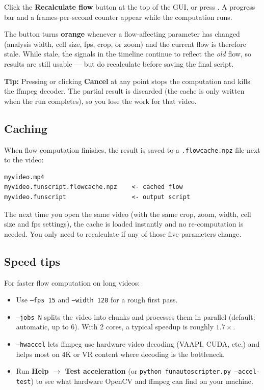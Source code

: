\documentclass[11pt,a4paper]{article}
\newcommand{\code}[1]{\texttt{#1}}
\newcommand{\key}[1]{\fbox{\small\texttt{#1}}}
\begin{document}
Click the \textbf{Recalculate flow} button at the top of the GUI, or press \key{R}. A progress bar and a frames-per-second counter appear while the computation runs.

The button turns \textbf{orange} whenever a flow-affecting parameter has changed (analysis width, cell size, fps, crop, or zoom) and the current flow is therefore stale. While stale, the signals in the timeline continue to reflect the \emph{old} flow, so results are still usable --- but do recalculate before saving the final script.

\begin{tipbox}
\textbf{Tip:} Pressing \key{Esc} or clicking \textbf{Cancel} at any point stops the computation and kills the ffmpeg decoder. The partial result is discarded (the cache is only written when the run completes), so you lose the work for that video.
\end{tipbox}

\subsection{Caching}

When flow computation finishes, the result is saved to a \code{.flowcache.npz} file next to the video:

\begin{lstlisting}
myvideo.mp4
myvideo.funscript.flowcache.npz    <- cached flow
myvideo.funscript                  <- output script
\end{lstlisting}

The next time you open the same video (with the same crop, zoom, width, cell size and fps settings), the cache is loaded instantly and no re-computation is needed. You only need to recalculate if any of those five parameters change.

\subsection{Speed tips}

For faster flow computation on long videos:

\begin{itemize}[noitemsep]
  \item Use \code{--fps 15} and \code{--width 128} for a rough first pass.
  \item \code{--jobs N} splits the video into chunks and processes them in parallel (default: automatic, up to 6). With 2 cores, a typical speedup is roughly $1.7\times$.
  \item \code{--hwaccel} lets ffmpeg use hardware video decoding (VAAPI, CUDA, etc.) and helps most on 4K or VR content where decoding is the bottleneck.
  \item Run \textbf{Help $\to$ Test acceleration} (or \code{python funautoscripter.py --accel-test}) to see what hardware OpenCV and ffmpeg can find on your machine.
\end{itemize}
\end{document}
